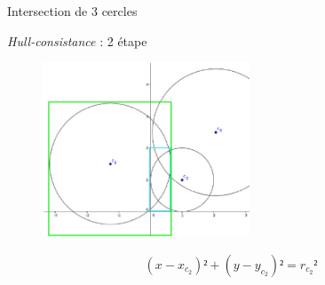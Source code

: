 \documentclass[frames,pdf,slideColor,colorBG,accumulate,total]{prosper}
\begin{document}
{\begin{slide}[Box]{Intersection de 3 cercles}
{    \emph{Hull-consistance} : 2 étape
      \begin{figure}[t]
        \begin{center}
          \includegraphics[width=0.55\textwidth]{img/hull2}
        \end{center}
      \end{figure}
   \begin{equation*}
       (x-x_{c_2})²+(y-y_{c_2})² = r_{c_2}²
    \end{equation*}
    }
  \end{slide}
}
 
\end{document}
